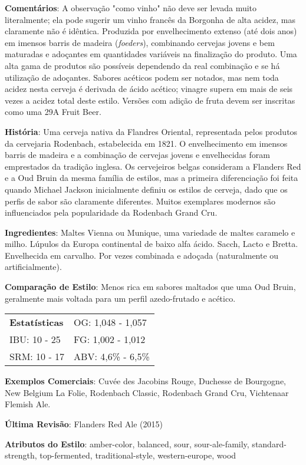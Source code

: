 \textbf{Comentários}: A observação "como vinho" não deve ser levada muito literalmente; ela pode sugerir um vinho francês da Borgonha de alta acidez, mas claramente não é idêntica. Produzida por envelhecimento extenso (até dois anos) em imensos barris de madeira (\textit{foeders}), combinando cervejas jovens e bem maturadas e adoçantes em quantidades variáveis na finalização do produto. Uma alta gama de produtos são possíveis dependendo da real combinação e se há utilização de adoçantes. Sabores acéticos podem ser notados, mas nem toda acidez nesta cerveja é derivada de ácido acético; vinagre supera em mais de seis vezes a acidez total deste estilo. Versões com adição de fruta devem ser inscritas como uma 29A Fruit Beer.

\textbf{História}: Uma cerveja nativa da Flandres Oriental, representada pelos produtos da cervejaria Rodenbach, estabelecida em 1821. O envelhecimento em imensos barris de madeira e a combinação de cervejas jovens e envelhecidas foram emprestados da tradição inglesa. Os cervejeiros belgas consideram a Flanders Red e a Oud Bruin da mesma família de estilos, mas a primeira diferenciação foi feita quando Michael Jackson inicialmente definiu os estilos de cerveja, dado que os perfis de sabor são claramente diferentes. Muitos exemplares modernos são influenciados pela popularidade da Rodenbach Grand Cru.

\textbf{Ingredientes}: Maltes Vienna ou Munique, uma variedade de maltes caramelo e milho. Lúpulos da Europa continental de baixo alfa ácido. Sacch, Lacto e Bretta. Envelhecida em carvalho. Por vezes combinada e adoçada (naturalmente ou artificialmente).

\textbf{Comparação de Estilo}: Menos rica em sabores maltados que uma Oud Bruin, geralmente mais voltada para um perfil azedo-frutado e acético.

\begin{tabular}{@{}p{35mm}p{35mm}@{}}
  \textbf{Estatísticas} & OG: 1,048 - 1,057 \\
  IBU: 10 - 25  & FG: 1,002 - 1,012  \\
  SRM: 10 - 17  & ABV: 4,6\% - 6,5\%
\end{tabular}

\textbf{Exemplos Comerciais}: Cuvée des Jacobins Rouge, Duchesse de Bourgogne, New Belgium La Folie, Rodenbach Classic, Rodenbach Grand Cru, Vichtenaar Flemish Ale.

\textbf{Última Revisão}: Flanders Red Ale (2015)

\textbf{Atributos do Estilo}: amber-color, balanced, sour, sour-ale-family, standard-strength, top-fermented, traditional-style, western-europe, wood
